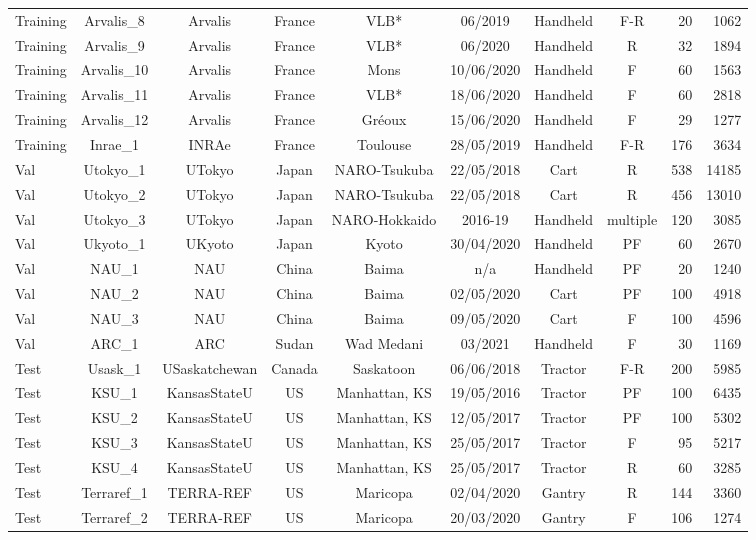 \begin{table}[h]
{\begin{small}
\begin{tabular}{lcccccccrr}
Training & Arvalis\_8 & Arvalis & France & VLB* & 06/2019 & Handheld & F-R & 20 & 1062 \\
Training & Arvalis\_9 & Arvalis & France & VLB* & 06/2020 & Handheld & R & 32 & 1894 \\
Training & Arvalis\_10 & Arvalis & France & Mons & 10/06/2020 & Handheld & F & 60 & 1563 \\
Training & Arvalis\_11 & Arvalis & France & VLB* & 18/06/2020 & Handheld & F & 60 & 2818 \\
Training & Arvalis\_12 & Arvalis & France & Gr\'eoux & 15/06/2020 & Handheld & F & 29 & 1277 \\
Training & Inrae\_1 & INRAe & France & Toulouse & 28/05/2019 & Handheld & F-R & 176 & 3634 \\
Val & Utokyo\_1 & UTokyo & Japan & NARO-Tsukuba & 22/05/2018 & Cart & R & 538 & 14185 \\
Val & Utokyo\_2 & UTokyo & Japan & NARO-Tsukuba & 22/05/2018 & Cart & R & 456 & 13010 \\
Val & Utokyo\_3 & UTokyo & Japan & NARO-Hokkaido & 2016-19 &  Handheld & multiple & 120 & 3085 \\
Val & Ukyoto\_1 & UKyoto & Japan & Kyoto & 30/04/2020 & Handheld & PF & 60 & 2670 \\
Val & NAU\_1 & NAU & China & Baima & n/a & Handheld & PF & 20 & 1240 \\
Val & NAU\_2 & NAU & China & Baima & 02/05/2020 & Cart & PF & 100 & 4918 \\
Val & NAU\_3 & NAU & China & Baima & 09/05/2020 & Cart & F & 100 & 4596 \\
Val & ARC\_1 & ARC & Sudan & Wad Medani & 03/2021 & Handheld & F & 30 & 1169 \\
Test & Usask\_1 & USaskatchewan & Canada & Saskatoon & 06/06/2018 & Tractor & F-R & 200 & 5985 \\
Test & KSU\_1 & KansasStateU & US & Manhattan, KS & 19/05/2016 & Tractor & PF & 100 & 6435 \\
Test & KSU\_2 & KansasStateU & US & Manhattan, KS & 12/05/2017 & Tractor & PF & 100 & 5302 \\
Test & KSU\_3 & KansasStateU & US & Manhattan, KS & 25/05/2017 & Tractor & F & 95 & 5217 \\
Test & KSU\_4 & KansasStateU & US & Manhattan, KS & 25/05/2017 & Tractor & R & 60 & 3285 \\
Test & Terraref\_1 & TERRA-REF & US & Maricopa & 02/04/2020 & Gantry & R & 144 & 3360 \\
Test & Terraref\_2 & TERRA-REF & US & Maricopa & 20/03/2020 & Gantry & F & 106 & 1274 \\

\end{tabular}
\end{small}}
\end{table}
